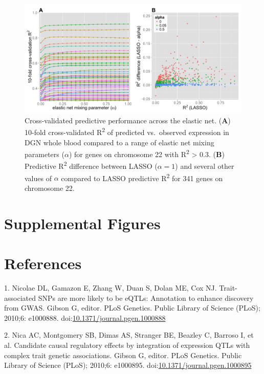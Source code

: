 \documentclass[]{article}
\begin{document}
\begin{figure}[htbp]
\centering
\includegraphics{GenArch_manuscript_files/figure-latex/EN-1.pdf}
\caption{Cross-validated predictive performance across the elastic net.
(\textbf{A}) 10-fold cross-validated R\textsuperscript{2} of predicted
vs.~observed expression in DGN whole blood compared to a range of
elastic net mixing parameters (\(\alpha\)) for genes on chromosome 22
with R\textsuperscript{2} \textgreater{} 0.3. (\textbf{B}) Predictive
R\textsuperscript{2} difference between LASSO (\(\alpha = 1\)) and
several other values of \(\alpha\) compared to LASSO predictive
R\textsuperscript{2} for 341 genes on chromosome 22.}
\end{figure}

\section{Supplemental Figures}\label{supplemental-figures}

\section*{References}\label{references}

1. Nicolae DL, Gamazon E, Zhang W, Duan S, Dolan ME, Cox NJ.
Trait-associated SNPs are more likely to be eQTLs: Annotation to enhance
discovery from GWAS. Gibson G, editor. PLoS Genetics. Public Library of
Science (PLoS); 2010;6: e1000888.
doi:\href{http://dx.doi.org/10.1371/journal.pgen.1000888}{10.1371/journal.pgen.1000888}

2. Nica AC, Montgomery SB, Dimas AS, Stranger BE, Beazley C, Barroso I,
et al. Candidate causal regulatory effects by integration of expression
QTLs with complex trait genetic associations. Gibson G, editor. PLoS
Genetics. Public Library of Science (PLoS); 2010;6: e1000895.
doi:\href{http://dx.doi.org/10.1371/journal.pgen.1000895}{10.1371/journal.pgen.1000895}
\end{document}
